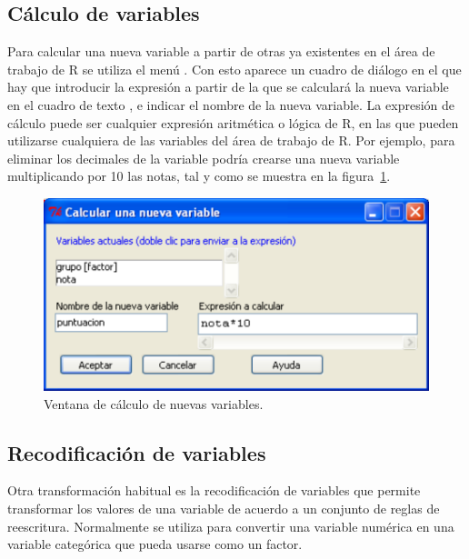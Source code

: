 \subsection{Cálculo de variables}
Para calcular una nueva variable a partir de otras ya existentes en el área de trabajo de R se utiliza el menú
.
Con esto aparece un cuadro de diálogo en el que hay que introducir la expresión a partir de la que se calculará la nueva
variable en el cuadro de texto , e indicar el nombre de la nueva variable.
La expresión de cálculo puede ser cualquier expresión aritmética o lógica de R, en las que pueden utilizarse cualquiera
de las variables del área de trabajo de R. Por ejemplo, para eliminar los decimales de la variable 
podría crearse una nueva variable  multiplicando por 10 las notas, tal y como se muestra en la
figura~\ref{g:calcular_variable}.

\begin{figure}[htp]
\begin{center}
  \includegraphics[scale=0.6]{capitulos/introduccion/img/calcular}
  \caption{Ventana de cálculo de nuevas variables.}
  \label{g:calcular_variable}
\end{center}
\end{figure}


\subsection{Recodificación de variables}
Otra transformación habitual es la recodificación de variables que permite transformar los valores de una variable de
acuerdo a un conjunto de reglas de reescritura. Normalmente se utiliza para convertir una variable numérica en una
variable categórica que pueda usarse como un factor. 

